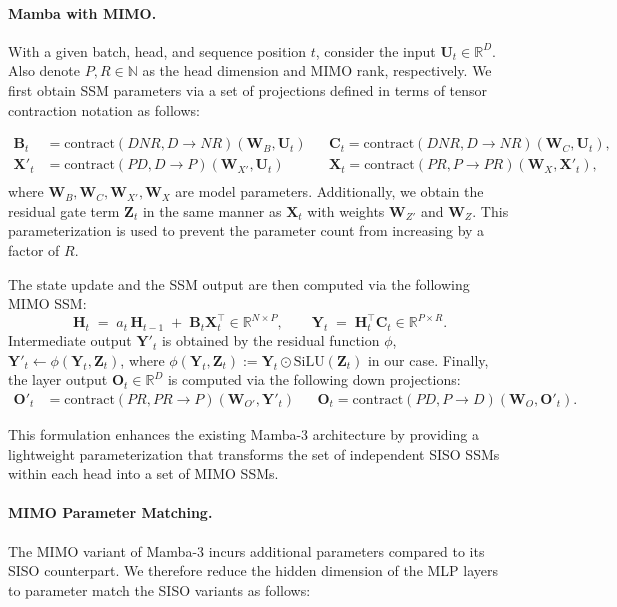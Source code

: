 \documentclass{article}
\def\bB{{\bm{B}}}
\def\bC{{\bm{C}}}
\def\bH{{\bm{H}}}
\def\bO{{\bm{O}}}
\def\bU{{\bm{U}}}
\def\bW{{\bm{W}}}
\def\bX{{\bm{X}}}
\def\bY{{\bm{Y}}}
\def\bZ{{\bm{Z}}}
\theoremstyle{plain}
\theoremstyle{definition}
\theoremstyle{remark}
\begin{document}
\paragraph{Mamba with MIMO.}
With a given batch, head, and sequence position $t$, consider the input $\bU_t \in \mathbb{R}^{D}$. Also denote $P, R\in\mathbb{N}$ as the head dimension and MIMO rank, respectively. We first obtain SSM parameters via a set of projections defined in terms of tensor contraction notation as follows:

\begin{align*}
    \bB_t &= \text{contract}(DNR,D\rightarrow NR)(\bW_B,\bU_t)
    && \bC_t = \text{contract}(DNR,D\rightarrow NR)(\bW_C,\bU_t),\\
    \bX'_t &= \text{contract}(PD,D\rightarrow P)(\bW_{X'},\bU_t)
    && \bX_t = \text{contract}(PR,P\rightarrow PR)(\bW_X,\bX'_t),\\
\end{align*}
where $\bW_B, \bW_C, \bW_{X'}, \bW_X$ are model parameters. Additionally, we obtain the residual gate term $\bZ_t$ in the same manner as $\bX_t$ with weights $\bW_{Z'}$ and $\bW_Z$.
This parameterization is used to prevent the parameter count from increasing by a factor of $R$.

The state update and the SSM output are then computed via the following MIMO SSM:
\[
\bH_t \;=\; a_t\,\bH_{t-1} \;+\; \bB_t \bX_t^\top \in \mathbb{R}^{N\times P},
\qquad
\bY_t \;=\; \bH_t ^\top \bC_{t} \in \mathbb{R}^{P\times R} .
\]
Intermediate output $\bY'_t$ is obtained by the residual function $\phi$, $\bY'_t \gets \phi(\bY_t, \bZ_t)$, where $\phi(\bY_t, \bZ_t):=\bY_t \odot \text{SiLU}(\bZ_t)$ in our case. 
Finally, the layer output $\bO_t \in \mathbb{R}^D$ is computed via the following down projections:
\begin{align*}
    \bO'_t &= \text{contract}(PR,PR\rightarrow P)(\bW_{O'},\bY'_t)
    && \bO_t = \text{contract}(PD,P\rightarrow D)(\bW_{O},\bO'_t).
\end{align*}

This formulation enhances the existing Mamba-3 architecture by providing a lightweight parameterization that transforms the set of independent SISO SSMs within each head into a set of MIMO SSMs.

\paragraph{MIMO Parameter Matching.}
The MIMO variant of Mamba-3 incurs additional parameters compared to its SISO counterpart. We therefore reduce the hidden dimension of the MLP layers to parameter match the SISO variants as follows:
\end{document}
